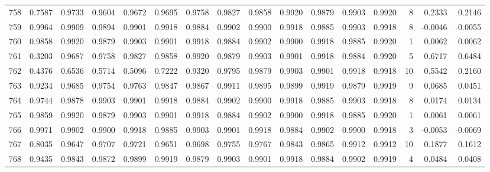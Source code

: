 \begin{tabular}{lrrrrrrrrrrrrrrr}
758 &      0.7587 &  0.9733 &  0.9604 &  0.9672 &  0.9695 &  0.9758 &  0.9827 &  0.9858 &  0.9920 &  0.9879 &   0.9903 &     0.9920 &      8 &                    0.2333 &                     0.2146 \\
759 &      0.9964 &  0.9909 &  0.9894 &  0.9901 &  0.9918 &  0.9884 &  0.9902 &  0.9900 &  0.9918 &  0.9885 &   0.9903 &     0.9918 &      8 &                   -0.0046 &                    -0.0055 \\
760 &      0.9858 &  0.9920 &  0.9879 &  0.9903 &  0.9901 &  0.9918 &  0.9884 &  0.9902 &  0.9900 &  0.9918 &   0.9885 &     0.9920 &      1 &                    0.0062 &                     0.0062 \\
761 &      0.3203 &  0.9687 &  0.9758 &  0.9827 &  0.9858 &  0.9920 &  0.9879 &  0.9903 &  0.9901 &  0.9918 &   0.9884 &     0.9920 &      5 &                    0.6717 &                     0.6484 \\
762 &      0.4376 &  0.6536 &  0.5714 &  0.5096 &  0.7222 &  0.9320 &  0.9795 &  0.9879 &  0.9903 &  0.9901 &   0.9918 &     0.9918 &     10 &                    0.5542 &                     0.2160 \\
763 &      0.9234 &  0.9685 &  0.9754 &  0.9763 &  0.9847 &  0.9867 &  0.9911 &  0.9895 &  0.9899 &  0.9919 &   0.9879 &     0.9919 &      9 &                    0.0685 &                     0.0451 \\
764 &      0.9744 &  0.9878 &  0.9903 &  0.9901 &  0.9918 &  0.9884 &  0.9902 &  0.9900 &  0.9918 &  0.9885 &   0.9903 &     0.9918 &      8 &                    0.0174 &                     0.0134 \\
765 &      0.9859 &  0.9920 &  0.9879 &  0.9903 &  0.9901 &  0.9918 &  0.9884 &  0.9902 &  0.9900 &  0.9918 &   0.9885 &     0.9920 &      1 &                    0.0061 &                     0.0061 \\
766 &      0.9971 &  0.9902 &  0.9900 &  0.9918 &  0.9885 &  0.9903 &  0.9901 &  0.9918 &  0.9884 &  0.9902 &   0.9900 &     0.9918 &      3 &                   -0.0053 &                    -0.0069 \\
767 &      0.8035 &  0.9647 &  0.9707 &  0.9721 &  0.9651 &  0.9698 &  0.9755 &  0.9767 &  0.9843 &  0.9865 &   0.9912 &     0.9912 &     10 &                    0.1877 &                     0.1612 \\
768 &      0.9435 &  0.9843 &  0.9872 &  0.9899 &  0.9919 &  0.9879 &  0.9903 &  0.9901 &  0.9918 &  0.9884 &   0.9902 &     0.9919 &      4 &                    0.0484 &                     0.0408 \\

\end{tabular}
